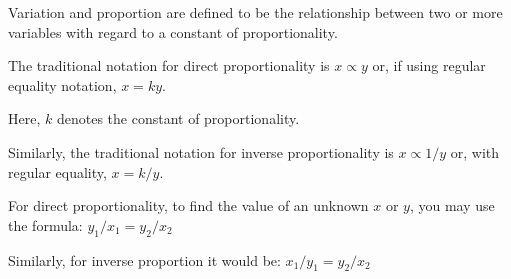 \documentclass[12pt]{article}
\begin{document}
Variation and proportion are defined to be the relationship between two or more variables with regard to a constant of proportionality.

The traditional notation for direct proportionality is $x \propto y$ or, if using regular equality notation, $x = ky$.

Here, $k$ denotes the constant of proportionality.

Similarly, the traditional notation for inverse proportionality is $x \propto 1/y$ or, with regular equality, $x = k/y$.

For direct proportionality, to find the value of an unknown $x$ or $y$, you may use the formula:
$y_{1}/x_{1} = y_{2}/x_{2}$

Similarly, for inverse proportion it would be:
$x_{1}/y_{1} = y_{2}/x_{2}$
\end{document}
